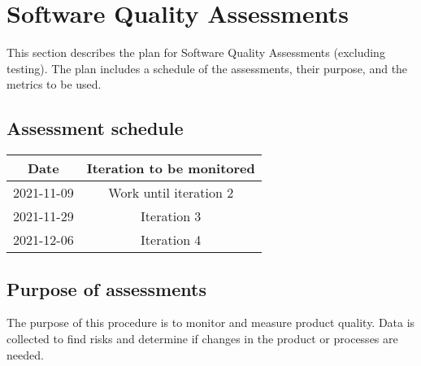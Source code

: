 \section{Software Quality Assessments}
\label{sec:sqa}
This section describes the plan for Software Quality Assessments (excluding testing). The plan includes a schedule of the assessments, their purpose, and the metrics to be used.



\subsection{Assessment schedule}
\label{subsec:assessment-schedule}
\begin{table}[H]
\centering
\begin{tabular}{||c c||} 
\hline
Date & Iteration to be monitored \\ [0.5ex] 
\hline\hline
2021-11-09 & Work until iteration 2 \\
\hline
2021-11-29 & Iteration 3 \\
\hline
2021-12-06 & Iteration 4 \\
\hline
\end{tabular}
\end{table}

\subsection{Purpose of assessments}
The purpose of this procedure is to monitor and measure product quality. Data is collected to find risks and determine if changes in the product or processes are needed.

